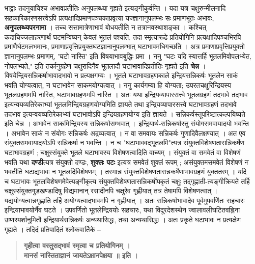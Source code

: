 भाट्टाः तदनुयायिश्च अभावप्रतीतिः अनुपलब्ध्या गृह्यते इत्यङ्गीकुर्वन्ति । यदा यत्र चक्षुरुन्मीलनादि सहकारिकारणसत्त्वेऽपि प्रत्यक्षादिप्रमाणपञ्चकाप्रवृत्या यज्ज्ञानानुपलम्भः सः प्रमाणभूतः अभावः, \textbf{अनुपलब्ध्यपरनामा} । तच्च सत्तामात्रेणाभावं बोधयतीति न तत्रानवस्थाशङ्का । कश्चित् कदाचिज्जलाहरणार्थं घटमन्विष्यन् केवलं भूतलं पश्यति, तदा स्मृत्यारूढे प्रतियोगिनि प्रत्यक्षादिपञ्चभिरपि प्रमाणैर्घटमलभमानः, प्रमाणाप्रवृत्तिप्रयुक्तघटज्ञानानुपलम्भात् घटाभावमधिगच्छति । अत्र प्रमाणाप्रवृत्तिप्रयुक्तो ज्ञानानुपलम्भः प्रमाणम्, 'घटो नास्ति' इति विषयाभावबुद्धिः प्रमा । ननु "घटः यदि स्यात्तर्हि भूतलमिवोपलभ्येत, नोपलभ्यते," इति तर्कानुग्रहेण चक्षुरादिनैव भूतलादौ घटाभावादिप्रतीतिः गृह्यते इति \textbf{चेन्न} । विषयेन्द्रियसन्निकर्षाभावादभावो न प्रत्यक्षगम्यः । भूतले घटाभावग्रहणकाले इन्द्रियसन्निकर्षः भूतलेन साकं भवति योग्यत्वात्, न घटाभावेन साकमयोग्यत्वात् । ननु कार्यगम्या हि योग्यता; उपरतचक्षुरिन्द्रियस्य भूतलग्रहणमपि नास्ति, घटाभावग्रहणमपि नास्ति । अतः यथा इन्द्रियव्यापारसत्त्वे भूतलग्रहणं तदभावे तदभाव इत्यन्वयव्यतिरेकाभ्यां भूतलमिन्द्रियग्रहणयोग्यमिति ज्ञायते तथा इन्द्रियव्यापारसत्त्वे घटाभावग्रहणं तदभावे तदभाव इत्यन्वयव्यतिरेकाभ्यां घटाभावोऽपि इन्द्रियग्रहणयोग्य इति ज्ञायते । सन्निकर्षस्तूपरिष्टात्कल्पयिष्यते इति चेन्न । अभावेन साकमिन्द्रियस्य सन्निकर्षासम्भवात् । इन्द्रियार्थ-सन्निकर्षास्तु संयोगसमवायादयो भवन्ति । अभावेन साकं न संयोगः सन्निकर्षः अद्रव्यत्वात् । न वा समवायः सन्निकर्षः गुणादिवैलक्षण्यात् । अत एव संयुक्तसमवायादयोऽपि सन्निकर्षा न भवन्ति । न च "घटाभाववद्भूतलमि"त्यत्र संयुक्तविशेषणतासन्निकर्षेण घटाभावग्रहणं ; चक्षुस्संयुक्ते भूतले घटाभावस्य विशेषणत्वादिति वाच्यम् । संयुक्तं वा समवेतं वा विशेषणं भवति यथा \textbf{दण्डी}त्यत्र संयुक्तो दण्डः, \textbf{शुक्लः पटः} इत्यत्र समवेतं शुक्लं रूपम् ; असंयुक्तमसमवेतं विशेषणं न भवतीति घटाद्यभावः न भूतलदिविशेषणम् । तस्मान्न संयुक्तविशेषणतासन्नकर्षेणाभावग्रहणं युक्ततरम् । यदि च घटाभावः भूतलविशेषणमेवेत्यङ्गीकृत्य संयुक्तविशेषणतासन्निकर्षोपकृतं चक्षुः तद्गृह्णाती-त्यङ्गीक्रियते तर्हि चक्षुस्संयुक्तगुडखण्डादिषु विद्यमानान् रसादीनपि चक्षुरेव गृह्णीयात् तत्र तेषामपि विशेषणत्वात् । यद्ययोग्यत्वान्नगृह्णाति तर्हि अयोग्यत्वादभावमपि न गृह्णीयात् । अतः सन्निकर्षाभावादेव पूर्वमुपवर्णितः सहचारः इन्द्रियाभावयोर्नैव घटते । उपवर्णितो भूतलेन्द्रिययोः सहचारः, यथा विदूरदेशस्थेन ज्वालावलीघटितवह्निना उष्णस्पर्शानुमितौ इन्द्रियार्थसन्निकर्षः अन्यथासिद्धः, तथा अन्यथासिद्धः । अतः प्रकृते घटाभावः न प्रत्यक्षेण गृह्यते । तदिदं प्रतिपादितं श्लोकवार्तिके –
\begin{verse}
\textbf{गृहीत्वा वस्तुसद्भावं स्मृत्वा च प्रतियोगिनम् ।}\\
\textbf{मानसं नास्तिताज्ञानं जायतेऽक्षानपेक्षया ॥  इति ।}
\end{verse}  
